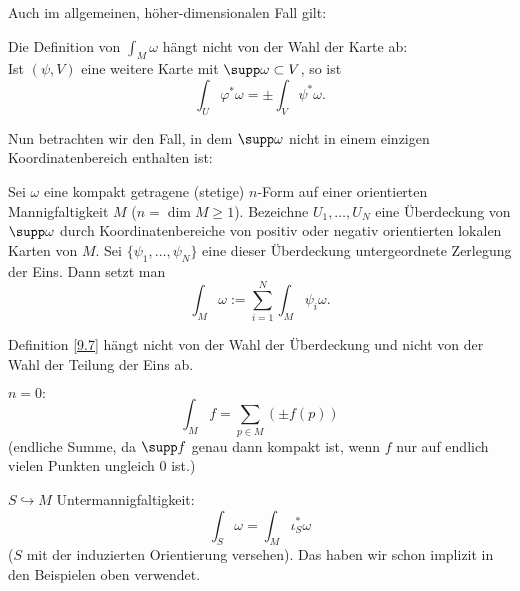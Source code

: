 Auch im allgemeinen, höher-dimensionalen Fall gilt:

\begin{lem}\autolabel
	Die Definition von $\int_M \omega$ hängt nicht von der Wahl der Karte ab:\\
	Ist \( (\psi,V) \) eine weitere Karte mit $\supp \omega \subset V$, so ist
	\[ \int_U \varphi^*\omega = \pm \int_V \psi^*\omega. \]
\end{lem}

Nun betrachten wir den Fall, in dem $\supp \omega$ nicht in einem einzigen Koordinatenbereich enthalten ist:

\begin{defn}\autolabel
	Sei $\omega$ eine kompakt getragene (stetige) $n$-Form auf einer orientierten Mannigfaltigkeit $M$ ($n = \dim M \geq 1$). Bezeichne \( U_1, \dotsc, U_N \) eine Überdeckung von $\supp \omega$ durch Koordinatenbereiche von positiv oder negativ orientierten lokalen Karten von $M$. Sei \( \{\psi_1, \dotsc, \psi_N\} \) eine dieser Überdeckung untergeordnete Zerlegung der Eins. Dann setzt man
	\[ \int_M \omega := \sum_{i=1}^{N} \int_M \psi_i \omega. \]
\end{defn}

\begin{lem}\autolabel
	Definition \ref{9.7} hängt nicht von der Wahl der Überdeckung und nicht von der Wahl der Teilung der Eins ab.
\end{lem}

\begin{rem*}
	\( n=0: \)\[ \int_M f = \sum_{p \in M} (\pm f(p)) \]
	(endliche Summe, da $\supp f$ genau dann kompakt ist, wenn $f$ nur auf endlich vielen Punkten ungleich 0 ist.)
\end{rem*}

\begin{rem}\autolabel
	\( S \hookrightarrow M \) Untermannigfaltigkeit:
	\[ \int_S \omega = \int_M \iota_S^*\omega \]
	($S$ mit der induzierten Orientierung versehen). Das haben wir schon implizit in den Beispielen oben verwendet.
\end{rem}


